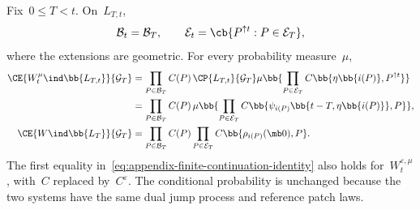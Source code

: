 \begin{proposition}
\label{prop:no-late-continuation-identity}
Fix~$0\leq T<t$. On~$L_{T,t}$,
\begin{equation*}
\mathcal B_t=\mathcal B_T,
\qquad
\mathcal E_t
=
\cb{P^{\uparrow t}:P\in\mathcal E_T},
\end{equation*}
where the extensions are geometric. For every probability measure~$\mu$,
\begin{align}
\CE{W_t^\mu\ind\bb{L_{T,t}}}{\mathcal G_T}
&=
\prod_{P\in\mathcal B_T}C(P)\,
\CP{L_{T,t}}{\mathcal G_T}
\mu\bb{
 \prod_{P\in\mathcal E_T}
 C\bb{\eta\bb{i(P)},P^{\uparrow t}}
}
\notag
\\
&=
\prod_{P\in\mathcal B_T}C(P)\,
\mu\bb{
 \prod_{P\in\mathcal E_T}
 C\bb{\psi_{i(P)}\bb{t-T,\eta\bb{i(P)}},P}
},
\label{eq:appendix-finite-continuation-identity}
\\
\CE{W\ind\bb{L_T}}{\mathcal G_T}
&=
\prod_{P\in\mathcal B_T}C(P)
\prod_{P\in\mathcal E_T}
C\bb{\rho_{i(P)}(\mb 0),P}.
\label{eq:appendix-infinite-continuation-identity}
\end{align}
The first equality in~\eqref{eq:appendix-finite-continuation-identity} also
holds for~$W_t^{\varepsilon,\mu}$, with~$C$ replaced by~$C^\varepsilon$. The
conditional probability is unchanged because the two systems have the same
dual jump process and reference patch laws.
\end{proposition}

